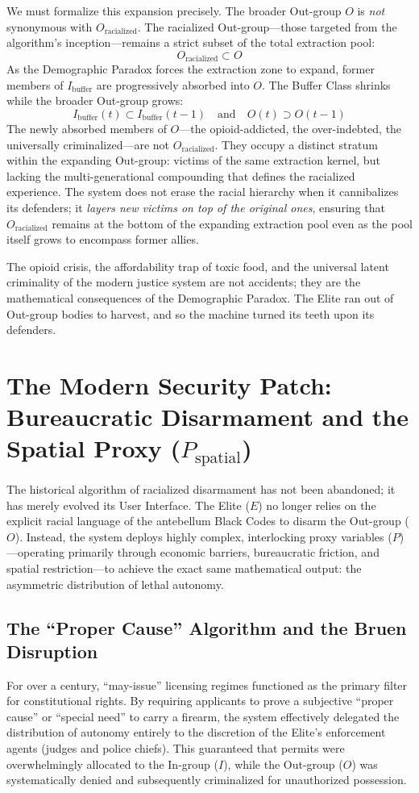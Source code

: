 \documentclass[12pt,openany]{book}
\begin{document}
We must formalize this expansion precisely. The broader Out-group $O$ is \textit{not} synonymous with $O_{\text{racialized}}$. The racialized Out-group---those targeted from the algorithm's inception---remains a strict subset of the total extraction pool:
\[
O_{\text{racialized}} \subset O
\]
As the Demographic Paradox forces the extraction zone to expand, former members of $I_{\text{buffer}}$ are progressively absorbed into $O$. The Buffer Class shrinks while the broader Out-group grows:
\[
I_{\text{buffer}}(t) \subset I_{\text{buffer}}(t-1) \quad \text{and} \quad O(t) \supset O(t-1)
\]
The newly absorbed members of $O$---the opioid-addicted, the over-indebted, the universally criminalized---are not $O_{\text{racialized}}$. They occupy a distinct stratum within the expanding Out-group: victims of the same extraction kernel, but lacking the multi-generational compounding that defines the racialized experience. The system does not erase the racial hierarchy when it cannibalizes its defenders; it \textit{layers new victims on top of the original ones}, ensuring that $O_{\text{racialized}}$ remains at the bottom of the expanding extraction pool even as the pool itself grows to encompass former allies.

The opioid crisis, the affordability trap of toxic food, and the universal latent criminality of the modern justice system are not accidents; they are the mathematical consequences of the Demographic Paradox. The Elite ran out of Out-group bodies to harvest, and so the machine turned its teeth upon its defenders.

\section{The Modern Security Patch: Bureaucratic Disarmament and the Spatial Proxy (\texorpdfstring{$P_{\text{spatial}}$}{P\_spatial})}

The historical algorithm of racialized disarmament has not been abandoned; it has merely evolved its User Interface. The Elite ($E$) no longer relies on the explicit racial language of the antebellum Black Codes to disarm the Out-group ($O$). Instead, the system deploys highly complex, interlocking proxy variables ($P$)---operating primarily through economic barriers, bureaucratic friction, and spatial restriction---to achieve the exact same mathematical output: the asymmetric distribution of lethal autonomy.

\subsection{The ``Proper Cause'' Algorithm and the Bruen Disruption}
For over a century, ``may-issue'' licensing regimes functioned as the primary filter for constitutional rights. By requiring applicants to prove a subjective ``proper cause'' or ``special need'' to carry a firearm, the system effectively delegated the distribution of autonomy entirely to the discretion of the Elite's enforcement agents (judges and police chiefs). This guaranteed that permits were overwhelmingly allocated to the In-group ($I$), while the Out-group ($O$) was systematically denied and subsequently criminalized for unauthorized possession.
\end{document}
